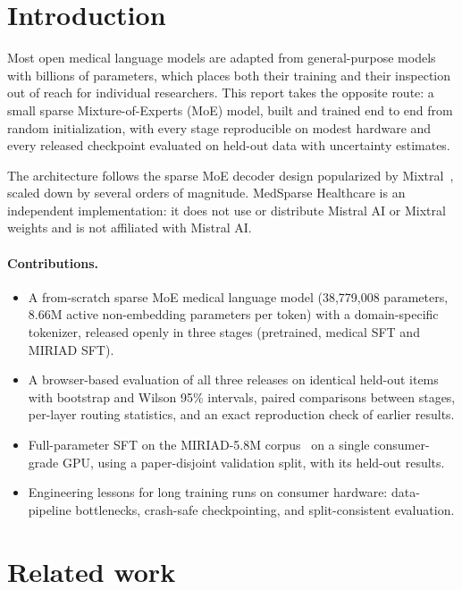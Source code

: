 \documentclass[11pt,a4paper]{article}
\begin{document}
\section{Introduction}

Most open medical language models are adapted from general-purpose models with billions of parameters, which places both their training and their inspection out of reach for individual researchers. This report takes the opposite route: a small sparse Mixture-of-Experts (MoE) model, built and trained end to end from random initialization, with every stage reproducible on modest hardware and every released checkpoint evaluated on held-out data with uncertainty estimates.

The architecture follows the sparse MoE decoder design popularized by Mixtral~\citep{jiang2024mixtral}, scaled down by several orders of magnitude. MedSparse Healthcare is an independent implementation: it does not use or distribute Mistral AI or Mixtral weights and is not affiliated with Mistral AI.

\paragraph{Contributions.}
\begin{itemize}
  \item A from-scratch sparse MoE medical language model (38,779,008 parameters, 8.66M active non-embedding parameters per token) with a domain-specific tokenizer, released openly in three stages (pretrained, medical SFT and MIRIAD SFT).
  \item A browser-based evaluation of all three releases on identical held-out items with bootstrap and Wilson 95\% intervals, paired comparisons between stages, per-layer routing statistics, and an exact reproduction check of earlier results.
  \item Full-parameter SFT on the MIRIAD-5.8M corpus~\citep{zheng2025miriad} on a single consumer-grade GPU, using a paper-disjoint validation split, with its held-out results.
  \item Engineering lessons for long training runs on consumer hardware: data-pipeline bottlenecks, crash-safe checkpointing, and split-consistent evaluation.
\end{itemize}

\section{Related work}
\end{document}
